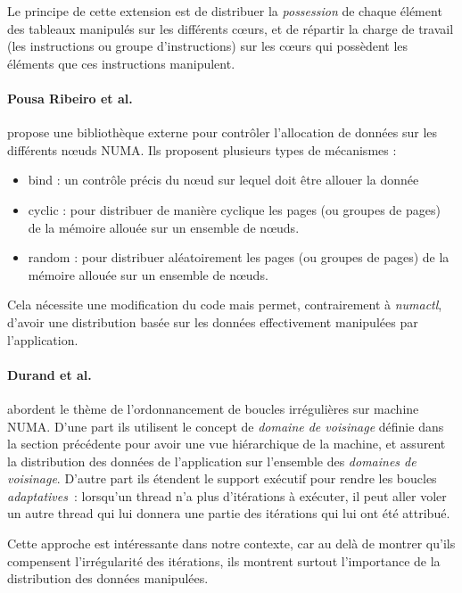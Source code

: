 Le principe de cette extension est de distribuer la \emph{possession} de chaque élément des tableaux manipulés sur les différents cœurs, et de répartir la charge de travail (les instructions ou groupe d'instructions) sur les cœurs qui possèdent les éléments que ces instructions manipulent.


\paragraph{Pousa Ribeiro et al.~\cite{Pousa2009}} propose une bibliothèque externe pour contrôler l'allocation de données sur les différents nœuds NUMA.
Ils proposent plusieurs types de mécanismes :
\begin{itemize}
  \item bind : un contrôle précis du nœud sur lequel doit être allouer la donnée
  \item cyclic : pour distribuer de manière cyclique les pages (ou groupes de pages) de la mémoire allouée sur un ensemble de nœuds.
  \item random : pour distribuer aléatoirement les pages (ou groupes de pages) de la mémoire allouée sur un ensemble de nœuds.
\end{itemize}
Cela nécessite une modification du code mais permet, contrairement à \emph{numactl}, d'avoir une distribution basée sur les données effectivement manipulées par l'application.



\paragraph{Durand et al.~\cite{Durand2013}} abordent le thème de l'ordonnancement de boucles irrégulières sur machine NUMA.
D'une part ils utilisent le concept de \emph{domaine de voisinage} définie dans la section précédente pour avoir une vue hiérarchique de la machine, et assurent la distribution des données de l'application sur l'ensemble des \emph{domaines de voisinage}.
D'autre part ils étendent le support exécutif pour rendre les boucles \emph{adaptatives}~: lorsqu'un thread n'a plus d'itérations à exécuter, il peut aller voler un autre thread qui lui donnera une partie des itérations qui lui ont été attribué.

Cette approche est intéressante dans notre contexte, car au delà de montrer qu'ils compensent l'irrégularité des itérations, ils montrent surtout l'importance de la distribution des données manipulées.

